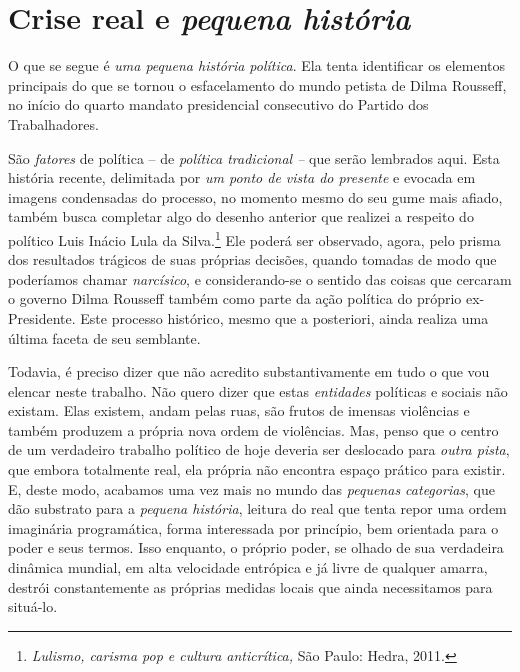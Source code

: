 \vspace*{7cm}

\section{Crise real e \emph{pequena
  história}}\label{crise-real-e-pequena-histuxf3ria}


O que se segue é \emph{uma pequena história política}. Ela tenta
identificar os elementos principais do que se tornou o esfacelamento do
mundo petista de Dilma Rousseff, no início do quarto mandato
presidencial consecutivo do Partido dos Trabalhadores.

São \emph{fatores} de política -- de \emph{política tradicional --} que
serão lembrados aqui. Esta história recente, delimitada por \emph{um
ponto de vista do presente} e evocada em imagens condensadas do
processo, no momento mesmo do seu gume mais afiado, também busca
completar algo do desenho anterior que realizei a respeito do político
Luis Inácio Lula da Silva.\footnote{\emph{Lulismo, carisma pop e cultura
anticrítica,} São Paulo: Hedra, 2011.} Ele
poderá ser observado, agora, pelo prisma dos resultados trágicos de suas
próprias decisões, quando tomadas de modo que poderíamos chamar
\emph{narcísico}, e considerando-se o sentido das coisas que cercaram o
governo Dilma Rousseff também como parte da ação política do próprio
ex-Presidente. Este processo histórico, mesmo que a posteriori, ainda
realiza uma última faceta de seu semblante.

Todavia, é preciso dizer que não acredito substantivamente em tudo o que
vou elencar neste trabalho. Não quero dizer que estas \emph{entidades}
políticas e sociais não existam. Elas existem, andam pelas ruas, são
frutos de imensas violências e também produzem a própria nova ordem de
violências. Mas, penso que o centro de um verdadeiro trabalho político
de hoje deveria ser deslocado para \emph{outra pista}, que embora
totalmente real, ela própria não encontra espaço prático para existir.
E, deste modo, acabamos uma vez mais no mundo das \emph{pequenas
categorias}, que dão substrato para a \emph{pequena história}, leitura
do real que tenta repor uma ordem imaginária programática, forma
interessada por princípio, bem orientada para o poder e seus termos.
Isso enquanto, o próprio poder, se olhado de sua verdadeira dinâmica
mundial, em alta velocidade entrópica e já livre de qualquer amarra,
destrói constantemente as próprias medidas locais que ainda necessitamos
para situá-lo.

